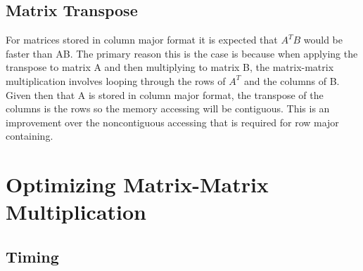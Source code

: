 \documentclass{article}
\begin{document}
\subsection{Matrix Transpose}

For matrices stored in column major format it is expected that $A^{T}B$ would be faster than AB. The primary reason this is the case is because when applying the transpose to matrix A and then multiplying to matrix B, the matrix-matrix multiplication involves looping through the rows of $A^{T}$ and the columns of B. Given then that A is stored in column major format, the transpose of the columns is the rows so the memory accessing will be contiguous. This is an improvement over the noncontiguous accessing that is required for row major containing. 

\section{Optimizing Matrix-Matrix Multiplication}

\subsection{Timing}
\begin{table}[ht!]
    \caption{Naive Matrix-Matrix Multiplication Timings (Seconds) on NOTS}
    \centering
\end{table}
\end{document}
